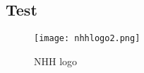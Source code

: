 \documentclass[../Main.tex]{subfiles}
\begin{document}
\renewcommand{\thesubsection}{A\arabic{subsection}}
\renewcommand{\thetable}{A\arabic{subsection}.\arabic{table}}

\subsection{Test}
\begin{figure}[h]
    \centering
    \caption{NHH logo}
    \texttt{[image: nhhlogo2.png]}
    \label{fig:logo2}
\end{figure}

\biblio %
\end{document}
